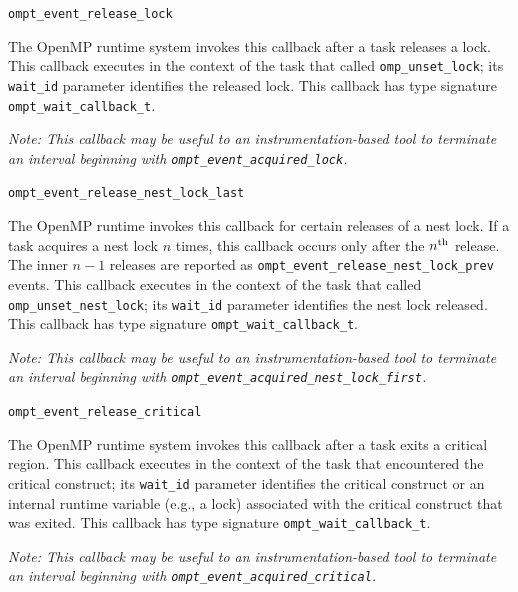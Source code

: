 \documentclass{article}
\newcommand{\descheader}[1]{{\needspace{3\baselineskip}\vspace{1em}\noindent \fbox{#1}}}
\begin{document}
\begin{description}

\item \verb|ompt_event_release_lock| 

   The OpenMP runtime system invokes this callback
after a task
   releases a lock. This callback executes in the context of the
   task that called \verb|omp_unset_lock|; its \verb|wait_id| parameter identifies the released lock.
   This callback has type signature \verb|ompt_wait_callback_t|. 
   
      {\em Note: This callback may be useful to an instrumentation-based tool to terminate an interval beginning with  
       \verb|ompt_event_acquired_lock|.}


\item \verb|ompt_event_release_nest_lock_last|

   The OpenMP runtime invokes this callback 
for certain releases of a
   nest lock.  If a task acquires a nest lock $n$ times, this callback
   occurs only after the $n^{\rm th}$ release.  The inner  $n-1$ releases are
   reported as \verb|ompt_event_release_nest_lock_prev| events.  This
   callback executes in the context of the task that called \verb|omp_unset_nest_lock|; its \verb|wait_id|
   parameter identifies the nest lock released.
This callback has type signature \verb|ompt_wait_callback_t|. 

  {\em Note: This callback may be useful to an instrumentation-based tool to terminate an interval beginning with  
       \verb|ompt_event_acquired_nest_lock_first|.}

\end{description}

\descheader{Critical Release}

\begin{description}
\item \verb|ompt_event_release_critical|

   The OpenMP runtime system invokes this callback after a task exits
   a critical region. This callback executes in the context of
   the task that encountered the critical construct; its \verb|wait_id| parameter identifies the critical construct or an internal runtime variable (e.g., a lock) associated with the critical construct that was exited.
   This callback  has type signature \verb|ompt_wait_callback_t|. 
   
     {\em Note: This callback may be useful to an instrumentation-based tool to terminate an interval beginning with  
       \verb|ompt_event_acquired_critical|.}
   
\end{description}
\end{document}
